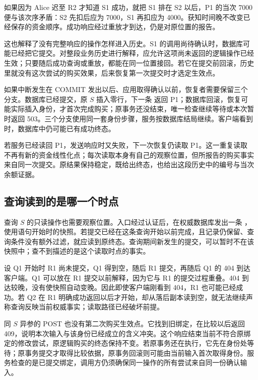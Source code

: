 如果因为 Alice 迟至 R2 才知道 S1 成功，就把 S1 排在 S2 以后，P1 的当次 7000 便与该次序矛盾：S2 先扣后应为 7000，S1 再扣应为 4000。获知时间晚不改变已经保存的资金顺序。成功响应经过重放才到达，仍是对原位置的报告。



这也解释了没有完整响应的操作怎样进入历史。S1 的调用尚待确认时，数据库可能已经把它提交。对整段业务历史进行解释，应允许这项尚未返回的逻辑操作已经生效；只要随后成功查询或重放，都能在同一位置接回。若它在提交前回滚，历史里就没有这次尝试的购买效果，后来恢复第一次提交时才选定生效点。

如果中断发生在 COMMIT 发出以后、应用取得确认以前，恢复者需要保留三个分支。数据库已经提交，原 \(S\) 插入零行，下一条  返回 P1；数据库回滚，恢复可能实际插入身份，才首次完成购买；原事务还没结束，唯一检查继续等待或本次暂时返回 503。三个分支使用同一套身份步骤，服务按数据库结局继续。客户端看到  时，数据库中仍可能已有成功终态。



若服务已经读回 P1，发送响应时又失败，下一次恢复仍读取 P1。这一重复读取不再有新的资金线性化点；每次读取本身有自己的观察位置，但所报告的购买事实来自同一次提交。原结果保持稳定，既给出终态，也给出这段历史中的编号与当次余额证据。

\subsection*{查询读到的是哪一个时点}

查询 \(S\) 的只读操作也需要观察位置。入口经过认证后，在权威数据库发出一条 ，使用语句开始时的快照。若提交已经在这条查询开始以前完成，且记录仍保留、查询条件没有额外过滤，就应读到原终态。查询期间新发生的提交，可以暂时不在该快照中；查不到描述的是这个读取时点的事实。

设 Q1 开始时 R1 尚未提交，Q1 得到空，随后 R1 提交，再随后 Q1 的 404 到达客户端。Q1 可以放在 R1 提交以前解释，因为它与 R1 的提交过程重叠。404 到达较晚，没有使快照自动变晚。因此即使客户端刚看到 404，R1 也可能已经成功。若 Q2 在 R1 明确成功返回以后才开始，却从落后副本读到空，就无法继续声称查询反映当前权威事实；读取路径已经破坏前提。



同 \(S\) 异参的 POST 也没有第二次购买生效点。它找到旧绑定，在比较以后返回 409，说明本次输入与该身份已经成立的含义冲突。这个响应结束当前不符合原绑定的修改尝试，原逻辑购买的终态保持不变。若原事务还在执行，它先在身份处等待；原事务提交才取得比较依据，原事务回滚则可能由当前输入首次取得身份。服务检查的是已提交绑定，调用方仍须确保同一操作的所有尝试来自同一份确认输入。

